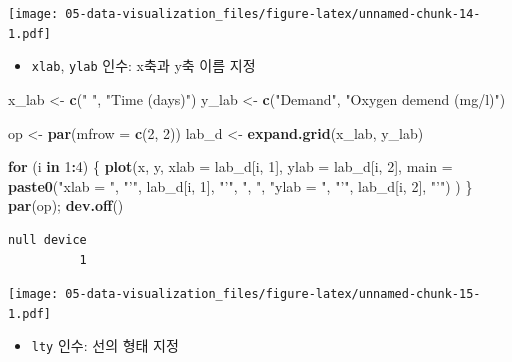 \documentclass[
  11pt,
]{krantz}
\newenvironment{Shaded}{\begin{snugshade}}{\end{snugshade}}
\newcommand{\ControlFlowTok}[1]{\textcolor[rgb]{0.27,0.27,0.27}{\textbf{#1}}}
\newcommand{\DataTypeTok}[1]{\textcolor[rgb]{0.27,0.27,0.27}{#1}}
\newcommand{\DecValTok}[1]{\textcolor[rgb]{0.06,0.06,0.06}{#1}}
\newcommand{\KeywordTok}[1]{\textcolor[rgb]{0.27,0.27,0.27}{\textbf{#1}}}
\newcommand{\NormalTok}[1]{#1}
\newcommand{\OperatorTok}[1]{\textcolor[rgb]{0.43,0.43,0.43}{\textbf{#1}}}
\newcommand{\StringTok}[1]{\textcolor[rgb]{0.5,0.5,0.5}{#1}}
\providecommand{\tightlist}{%
  \setlength{\itemsep}{0pt}\setlength{\parskip}{0pt}}
\begin{document}
\texttt{[image: 05-data-visualization\_files/figure-latex/unnamed-chunk-14-1.pdf]}

\normalsize

\begin{itemize}
\tightlist
\item
  \texttt{xlab}, \texttt{ylab} 인수: x축과 y축 이름 지정
\end{itemize}

\footnotesize

\begin{Shaded}
\begin{Highlighting}[]
\NormalTok{x_lab <-}\StringTok{ }\KeywordTok{c}\NormalTok{(}\StringTok{" "}\NormalTok{, }\StringTok{"Time (days)"}\NormalTok{)}
\NormalTok{y_lab <-}\StringTok{ }\KeywordTok{c}\NormalTok{(}\StringTok{"Demand"}\NormalTok{, }\StringTok{"Oxygen demend (mg/l)"}\NormalTok{)}

\NormalTok{op <-}\StringTok{ }\KeywordTok{par}\NormalTok{(}\DataTypeTok{mfrow =} \KeywordTok{c}\NormalTok{(}\DecValTok{2}\NormalTok{, }\DecValTok{2}\NormalTok{))}
\NormalTok{lab_d <-}\StringTok{ }\KeywordTok{expand.grid}\NormalTok{(x_lab, y_lab)}

\ControlFlowTok{for}\NormalTok{ (i }\ControlFlowTok{in} \DecValTok{1}\OperatorTok{:}\DecValTok{4}\NormalTok{) \{}
  \KeywordTok{plot}\NormalTok{(x, y, }
       \DataTypeTok{xlab =}\NormalTok{ lab_d[i, }\DecValTok{1}\NormalTok{], }
       \DataTypeTok{ylab =}\NormalTok{ lab_d[i, }\DecValTok{2}\NormalTok{], }
       \DataTypeTok{main =} \KeywordTok{paste0}\NormalTok{(}\StringTok{"xlab = "}\NormalTok{, }\StringTok{"'"}\NormalTok{, lab_d[i, }\DecValTok{1}\NormalTok{], }\StringTok{"'"}\NormalTok{, }\StringTok{", "}\NormalTok{, }
                     \StringTok{"ylab = "}\NormalTok{, }\StringTok{"'"}\NormalTok{, lab_d[i, }\DecValTok{2}\NormalTok{], }\StringTok{"'"}\NormalTok{)}
\NormalTok{  )}
\NormalTok{\}}
\KeywordTok{par}\NormalTok{(op); }\KeywordTok{dev.off}\NormalTok{()}
\end{Highlighting}
\end{Shaded}

\begin{verbatim}
null device 
          1 
\end{verbatim}

\texttt{[image: 05-data-visualization\_files/figure-latex/unnamed-chunk-15-1.pdf]}

\normalsize

\begin{itemize}
\tightlist
\item
  \texttt{lty} 인수: 선의 형태 지정
\end{itemize}
\end{document}
